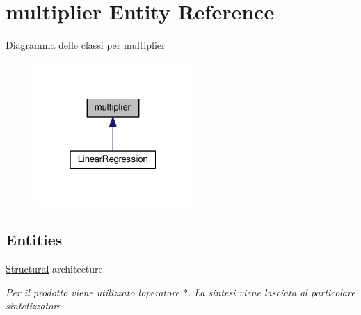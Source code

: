 \hypertarget{classmultiplier}{}\section{multiplier Entity Reference}
\label{classmultiplier}


Diagramma delle classi per multiplier
\nopagebreak
\begin{figure}[H]
\begin{center}
\leavevmode
\includegraphics[width=172pt]{classmultiplier__inherit__graph}
\end{center}
\end{figure}
\subsection*{Entities}
\begin{DoxyCompactItemize}
\item 
\hyperlink{classmultiplier_1_1_structural}{Structural} architecture
\begin{DoxyCompactList}\small\item\em Per il prodotto viene utilizzato l\textquotesingle{}operatore $\ast$. La sintesi viene lasciata al particolare sintetizzatore. \end{DoxyCompactList}\end{DoxyCompactItemize}
